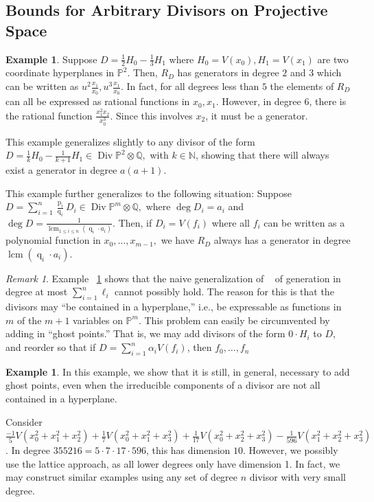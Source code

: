 \documentclass{amsart}
\theoremstyle{plain}
\theoremstyle{definition}
\newtheorem{example}[thm]{Example}
\theoremstyle{remark}
\newtheorem{rem}[thm]{Remark}
\numberwithin{equation}{section}
\newcommand\ssec{\subsection}
\newcommand\bn{{\mathbb N}}
\newcommand\bq{{\mathbb Q}}
\newcommand\bp{{\mathbb P}}
\DeclareMathOperator\di{Div}
\newcommand\bida{a}
\DeclareMathOperator{\num}{p}
\DeclareMathOperator{\den}{q}
\DeclareMathOperator{\lcm}{lcm}
\begin{document}
\ssec{Bounds for Arbitrary Divisors on Projective Space}

\begin{example}
\label{eg:hyperplane}
Suppose $D = \frac{1}{2}H_0 - \frac{1}{3}H_1$ where $H_0 = V(x_0), H_1 = V(x_1)$ are two coordinate hyperplanes in $\bp^2$. Then, $R_D$ has generators in degree $2$ and $3$ which can be written as $u^2 \frac{x_1}{x_0}, u^3 \frac{x_1}{x_0}.$ In fact, for all degrees less than $5$ the elements of $R_D$ can all be expressed as rational functions in $x_0, x_1$. However, in degree $6$, there is the rational function $\frac{x_1^2 x_2}{x_0^3}.$ Since this involves $x_2$, it must be a generator.

This example generalizes slightly to any divisor of the form $D = \frac{1}{k}H_0 - \frac{1}{k+1}H_1 \in \di \bp^2 \otimes \bq,$ with $k \in \bn$, showing that there will always exist a generator in degree $a(a+1).$

This example further generalizes to the following situation: Suppose $D = \sum_{i=1}^{n} \frac{\num_i}{\den_i}D_i \in \di \bp^m \otimes \bq,$ where $\deg D_i = \bida_i$ and $\deg D = \frac{1}{\lcm_{1 \leq i \leq n}(\den_i \cdot \bida_i)}$. Then, if $D_i = V(f_i)$ where all $f_i$ can be written as a polynomial function in $x_0, \ldots, x_{m-1},$ we have $R_D$ always has a generator in degree $\lcm(\den_i \cdot \bida_i)$.
\end{example}

\begin{rem}
\label{rem:ghost-motivation}
Example ~\ref{eg:hyperplane} shows that the naive generalization of ~\cite[Theorem 8]{dorney:canonical} of generation in degree at most $\sum_{i=1}^{n}\ell_i$ cannot possibly hold. The reason for this is that the divisors may ``be contained in a hyperplane,'' i.e., be expressable as functions in $m$ of the $m+1$ variables on $\bp^m$. This problem can easily be circumvented by adding in ``ghost points.'' That is, we may add divisors of the form $0 \cdot H_i$ to $D$, and reorder so that if $D = \sum_{i=1}^{n}\alpha_i V(f_i)$, then $f_0, \ldots, f_n$
\end{rem}

\begin{example}
\label{eg:radical}
In this example, we show that it is still, in general, necessary to add ghost points, even when the irreducible components of a divisor are not all contained in a hyperplane.

Consider $\frac{-1}{5}V(x_0^2 + x_1^2 + x_2^2) + \frac{1}{7}V(x_0^2 + x_1^2 + x_3^2) + \frac{1}{17}V(x_0^2 + x_2^2 + x_3^2) - \frac{1}{596}V(x_1^2 + x_2^2 + x_3^2)$. In degree $355216 = 5 \cdot 7 \cdot 17 \cdot 596$, this has dimension $10$. 
However, we possibly use the lattice approach, as all lower degrees only have dimension 1. In fact, we may construct similar examples using any set of degree $n$ divisor with very small degree.
\end{example}
\end{document}
